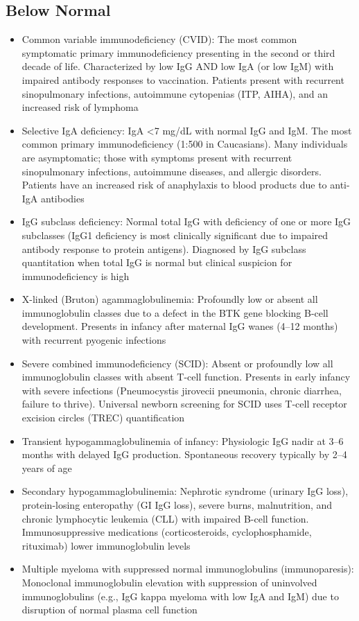 \subsection*{Below Normal}
\begin{itemize}
  \item Common variable immunodeficiency (CVID): The most common symptomatic primary immunodeficiency presenting in the second or third decade of life. Characterized by low IgG AND low IgA (or low IgM) with impaired antibody responses to vaccination. Patients present with recurrent sinopulmonary infections, autoimmune cytopenias (ITP, AIHA), and an increased risk of lymphoma
  \item Selective IgA deficiency: IgA <7 mg/dL with normal IgG and IgM. The most common primary immunodeficiency (1:500 in Caucasians). Many individuals are asymptomatic; those with symptoms present with recurrent sinopulmonary infections, autoimmune diseases, and allergic disorders. Patients have an increased risk of anaphylaxis to blood products due to anti-IgA antibodies
  \item IgG subclass deficiency: Normal total IgG with deficiency of one or more IgG subclasses (IgG1 deficiency is most clinically significant due to impaired antibody response to protein antigens). Diagnosed by IgG subclass quantitation when total IgG is normal but clinical suspicion for immunodeficiency is high
  \item X-linked (Bruton) agammaglobulinemia: Profoundly low or absent all immunoglobulin classes due to a defect in the BTK gene blocking B-cell development. Presents in infancy after maternal IgG wanes (4--12 months) with recurrent pyogenic infections
  \item Severe combined immunodeficiency (SCID): Absent or profoundly low all immunoglobulin classes with absent T-cell function. Presents in early infancy with severe infections (Pneumocystis jirovecii pneumonia, chronic diarrhea, failure to thrive). Universal newborn screening for SCID uses T-cell receptor excision circles (TREC) quantification
  \item Transient hypogammaglobulinemia of infancy: Physiologic IgG nadir at 3--6 months with delayed IgG production. Spontaneous recovery typically by 2--4 years of age
  \item Secondary hypogammaglobulinemia: Nephrotic syndrome (urinary IgG loss), protein-losing enteropathy (GI IgG loss), severe burns, malnutrition, and chronic lymphocytic leukemia (CLL) with impaired B-cell function. Immunosuppressive medications (corticosteroids, cyclophosphamide, rituximab) lower immunoglobulin levels
  \item Multiple myeloma with suppressed normal immunoglobulins (immunoparesis): Monoclonal immunoglobulin elevation with suppression of uninvolved immunoglobulins (e.g., IgG kappa myeloma with low IgA and IgM) due to disruption of normal plasma cell function
\end{itemize}

